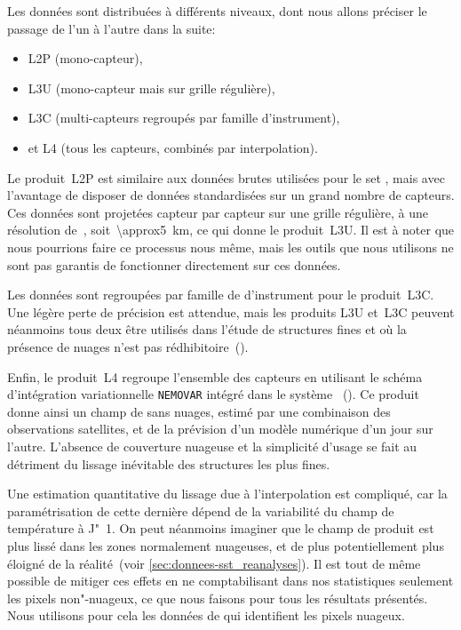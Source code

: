 Les données sont distribuées à différents niveaux, dont nous allons préciser le passage de l'un à l'autre dans la suite:
\begin{itemize}
  \item L2P (mono-capteur),
  \item L3U (mono-capteur mais sur grille régulière),
  \item L3C (multi-capteurs regroupés par famille d'instrument),
  \item et L4 (tous les capteurs, combinés par interpolation).
\end{itemize}

Le produit~L2P est similaire aux données brutes utilisées pour le set , mais avec l'avantage de disposer de données standardisées sur un grand nombre de capteurs.
Ces données sont projetées capteur par capteur sur une grille régulière, à une résolution de~, soit~\qty{\approx5}{\km}, ce qui donne le produit~L3U.
Il est à noter que nous pourrions faire ce processus nous même, mais les outils que nous utilisons ne sont pas garantis de fonctionner directement sur ces données.

Les données sont regroupées par famille de d'instrument pour le produit~L3C. Une légère perte de précision est attendue, mais les produits L3U et~L3C peuvent néanmoins tous deux être utilisés dans l'étude de structures fines et où la présence de nuages n'est pas rédhibitoire~(\cite{merchant_2019}).

Enfin, le produit~L4 regroupe l'ensemble des capteurs en utilisant le schéma d'intégration variationnelle \verb|NEMOVAR| intégré dans le système ~(\cite{good_2020}).
Ce produit donne ainsi un champ de  sans nuages, estimé par une combinaison des observations satellites, et de la prévision d'un modèle numérique d'un jour sur l'autre.
L'absence de couverture nuageuse et la simplicité d'usage se fait au détriment du lissage inévitable des structures les plus fines.

Une estimation quantitative du lissage due à l'interpolation est compliqué, car la paramétrisation de cette dernière dépend de la variabilité du champ de température à J"~1.
On peut néanmoins imaginer que le champ de  produit est plus lissé dans les zones normalement nuageuses, et de plus potentiellement plus éloigné de la réalité~(voir \cref{sec:donnees-sst_reanalyses}).
Il est tout de même possible de mitiger ces effets en ne comptabilisant dans nos statistiques seulement les pixels non"-nuageux, ce que nous faisons pour tous les résultats présentés.
Nous utilisons pour cela les données de  qui identifient les pixels nuageux.

